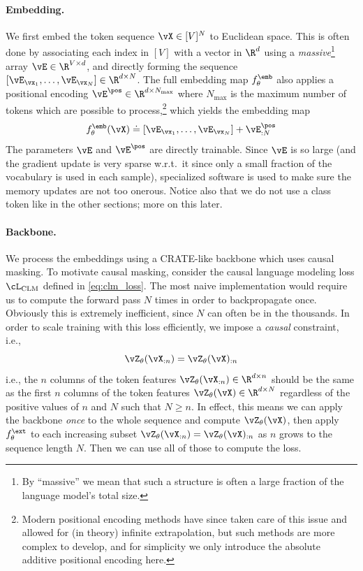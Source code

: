 \documentclass[../../book-main.tex]{subfiles}
\begin{document}
\paragraph{Embedding.} We first embed the token sequence \(\vX \in
[V]^{N}\) to Euclidean space. This is often done by associating each
index in \([V]\) with a vector in \(\R^{d}\) using a
\textit{massive}\footnote{By ``massive'' we mean that such a
structure is often a large fraction of the language model's total
size.} array \(\vE \in \R^{V \times d}\), and directly forming the
sequence \([\vE_{\vx_{1}}, \dots, \vE_{\vx_{N}}] \in \R^{d \times
N}\). The full embedding map \(f_{\theta}^{\emb}\) also applies a
positional encoding \(\vE^{\pos} \in \R^{d  \times N_{\max}}\) where
\(N_{\max}\) is the maximum number of tokens which are possible to
process,\footnote{Modern positional encoding methods have since taken
care of this issue and allowed for (in theory) infinite
extrapolation, but such methods are more complex to develop, and for
simplicity we only introduce the absolute additive positional
encoding here.} which yields the embedding map
\begin{equation}
f_{\theta}^{\emb}(\vX) \doteq [\vE_{\vx_{1}}, \dots, \vE_{\vx_{N}}] +
\vE_{:N}^{\pos}
\end{equation}
The parameters \(\vE\) and \(\vE^{\pos}\) are directly trainable.
Since \(\vE\) is so large (and the gradient update is very sparse
w.r.t.~it since only a small fraction of the vocabulary is used in
each sample), specialized software is used to make sure the memory
updates are not too onerous. Notice also that we do not use a class
token like in the other sections; more on this later.

\paragraph{Backbone.} We process the embeddings using a CRATE-like
backbone which uses causal masking. To motivate causal masking,
consider the causal language modeling loss \(\cL_{\mathrm{CLM}}\)
defined in \eqref{eq:clm_loss}. The most naive implementation would
require us to compute the forward pass \(N\) times in order to
backpropagate once. Obviously this is extremely inefficient, since
\(N\) can often be in the thousands. In order to scale training with
this loss efficiently, we impose a \textit{causal} constraint, i.e.,
\begin{equation}\label{eq:causal_backbone_def}
\vZ_{\theta}(\vX_{:n}) = \vZ_{\theta}(\vX)_{:n}
\end{equation}
i.e., the \(n\) columns of the token features
\(\vZ_{\theta}(\vX_{:n}) \in \R^{d \times n}\) should be the same as
the first \(n\) columns of the token features \(\vZ_{\theta}(\vX) \in
\R^{d \times N}\) regardless of the positive values of \(n\) and
\(N\) such that \(N \geq n\). In effect, this means we can apply the
backbone \textit{once} to the whole sequence and compute
\(\vZ_{\theta}(\vX)\), then apply \(f_{\theta}^{\ext}\) to each
increasing subset \(\vZ_{\theta}(\vX_{:n}) = \vZ_{\theta}(\vX)_{:n}\)
as \(n\) grows to the sequence length \(N\). Then we can use all of
those to compute the loss.
\end{document}
